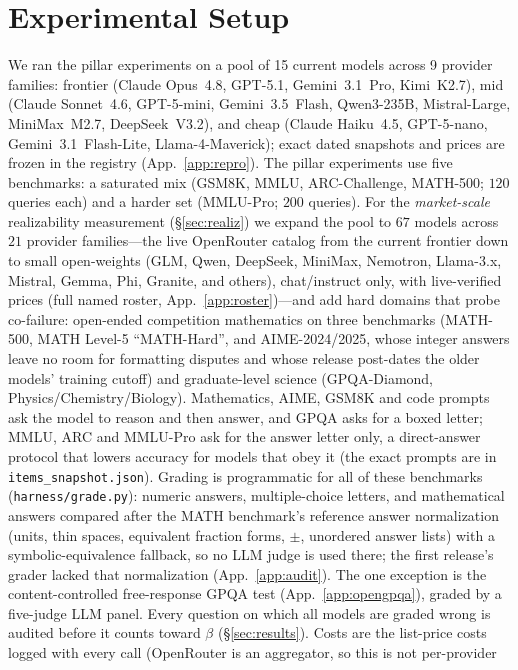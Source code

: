 \documentclass[11pt]{article}
\theoremstyle{plain}
\theoremstyle{definition}
\begin{document}
\section{Experimental Setup}\label{sec:setup}
We ran the pillar experiments on a pool of 15 current models across 9 provider families: frontier (Claude
Opus~4.8, GPT-5.1, Gemini~3.1~Pro, Kimi~K2.7), mid (Claude Sonnet~4.6, GPT-5-mini, Gemini~3.5~Flash, Qwen3-235B, Mistral-Large,
MiniMax~M2.7, DeepSeek~V3.2), and cheap (Claude Haiku~4.5, GPT-5-nano, Gemini~3.1~Flash-Lite, Llama-4-Maverick); exact dated
snapshots and prices are frozen in the registry (App.~\ref{app:repro}). The pillar experiments use five benchmarks: a saturated
mix (GSM8K, MMLU, ARC-Challenge, MATH-500; $120$ queries each) and a harder set (MMLU-Pro; $200$ queries). For the
\emph{market-scale} realizability measurement (\S\ref{sec:realiz}) we expand the pool to $67$ models across $21$ provider
families---the live OpenRouter catalog from the current frontier down to small open-weights (GLM, Qwen, DeepSeek, MiniMax,
Nemotron, Llama-3.x, Mistral, Gemma, Phi, Granite, and others), chat/instruct only, with live-verified prices (full named roster, App.~\ref{app:roster})---and add hard domains that probe co-failure: open-ended competition
mathematics on three benchmarks (MATH-500, MATH Level-5 ``MATH-Hard'', and AIME-2024/2025, whose integer answers leave no
room for formatting disputes and whose release post-dates the older models' training cutoff) and graduate-level science (GPQA-Diamond, Physics/Chemistry/Biology). Mathematics, AIME, GSM8K and code prompts ask the model to reason and then answer, and GPQA asks for a boxed letter; MMLU,
ARC and MMLU-Pro ask for the answer letter only, a direct-answer protocol that lowers accuracy for models that obey it (the
exact prompts are in \texttt{items\_snapshot.json}). Grading is programmatic for all of these benchmarks
(\texttt{harness/grade.py}): numeric answers, multiple-choice letters, and mathematical answers compared after the MATH
benchmark's reference answer normalization (units, thin spaces, equivalent fraction forms, $\pm$, unordered answer lists)
with a symbolic-equivalence fallback, so no LLM judge is used there; the first release's grader lacked that normalization
(App.~\ref{app:audit}). The one exception is the content-controlled free-response GPQA test (App.~\ref{app:opengpqa}), graded
by a five-judge LLM panel. Every question on which all models are graded wrong is audited before it counts toward $\beta$
(\S\ref{sec:results}).
Costs are the list-price costs logged with every call (OpenRouter is an aggregator, so this is not per-provider
\end{document}
